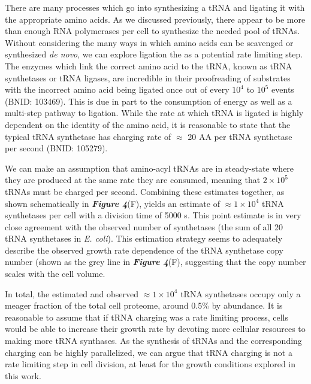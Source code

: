 There are many processes which go into synthesizing a tRNA and ligating it
with the appropriate amino acids. As we discussed previously, there appear to
be more than enough RNA polymerases per cell to synthesize the needed pool of
tRNAs. Without considering the many ways in which amino acids can be
scavenged or synthesized \textit{de novo}, we can explore ligation the as a
potential rate limiting step. The enzymes which link the correct amino acid
to the tRNA, known as tRNA synthetases or tRNA ligases, are incredible in
their proofreading of substrates with the incorrect amino acid being ligated
once out of every $10^4$ to $10^5$ events (BNID: 103469). This is due in part
to the consumption of energy as well as a multi-step pathway to ligation.
While the rate at which tRNA is ligated is highly dependent on the identity
of the amino acid, it is reasonable to state that the typical tRNA synthetase
has charging rate of $\approx$ 20 AA per tRNA synthetase per second (BNID:
105279).

We can make an assumption that amino-acyl tRNAs are in steady-state where
they are produced at the same rate they are consumed, meaning that $2 \times
10^5$ tRNAs must be charged per second. Combining these estimates together,
as shown schematically in \textbf{\textit{Figure 4}}(F), yields an estimate of $\approx 1\times 10^{4}$
tRNA synthetases per cell with a division time of 5000 s. This point estimate
is in very close agreement with the observed number of synthetases (the sum
of all 20 tRNA synthetases in \textit{E. coli}). This estimation strategy
seems to adequately describe the observed growth rate dependence of the tRNA
synthetase copy number (shown as the grey line in \textbf{\textit{Figure 4}}(F), suggesting
that the copy number scales with the cell volume.

In total, the estimated and observed $\approx 1\times 10^{4}$ tRNA synthetases occupy
only a meager fraction of the total cell proteome, around 0.5\% by abundance.
It is reasonable to assume that if tRNA charging was a rate limiting process,
cells would be able to increase their growth rate by devoting more cellular
resources to making more tRNA synthases. As the synthesis of tRNAs and the
corresponding charging can be highly parallelized, we can argue that tRNA
charging is not a rate limiting step in cell division, at least for the
growth conditions explored in this work.
